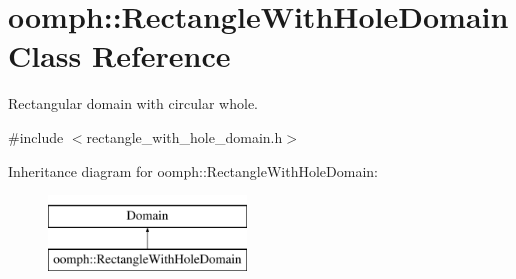 \hypertarget{classoomph_1_1RectangleWithHoleDomain}{}\section{oomph\+:\+:Rectangle\+With\+Hole\+Domain Class Reference}
\label{classoomph_1_1RectangleWithHoleDomain}


Rectangular domain with circular whole.  




{\ttfamily \#include $<$rectangle\+\_\+with\+\_\+hole\+\_\+domain.\+h$>$}

Inheritance diagram for oomph\+:\+:Rectangle\+With\+Hole\+Domain\+:\begin{figure}[H]
\begin{center}
\leavevmode
\includegraphics[height=2.000000cm]{classoomph_1_1RectangleWithHoleDomain}
\end{center}
\end{figure}

